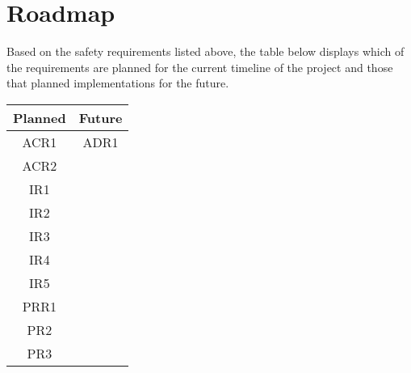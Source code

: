 \documentclass{article}
\begin{document}
	\section{Roadmap}
	
	
	Based on the safety requirements listed above, the table below displays which of the requirements are planned for the current timeline of the project and those that planned implementations for the future.
	
	\begin{center}
		\begin{tabular}{ |c|c| } 
			\hline
			Planned & Future \\
			\hline 
			\hline
			ACR1 & ADR1 \\ 
			\hline
			ACR2 & \\
			\hline
			IR1 & \\
			\hline
			IR2 & \\
			\hline
			IR3 & \\
			\hline
			IR4 & \\
			\hline
			IR5 & \\
			\hline 
			PRR1 & \\ 
			\hline
			PR2 & \\
			\hline
			PR3 & \\
			\hline
		\end{tabular}
	\end{center}
\end{document}
